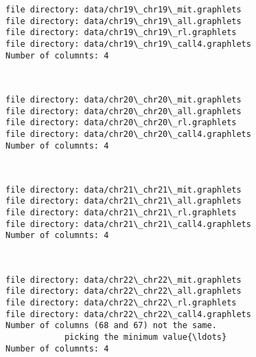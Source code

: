 \documentclass[11pt]{article}
\begin{document}
    \begin{Verbatim}[commandchars=\\\{\}]
file directory: data/chr19\_chr19\_mit.graphlets
file directory: data/chr19\_chr19\_all.graphlets
file directory: data/chr19\_chr19\_rl.graphlets
file directory: data/chr19\_chr19\_call4.graphlets
Number of columnts: 4

    \end{Verbatim}

    \begin{center}
    \end{center}
    { \hspace*{\fill} \\}
    
    \begin{Verbatim}[commandchars=\\\{\}]
file directory: data/chr20\_chr20\_mit.graphlets
file directory: data/chr20\_chr20\_all.graphlets
file directory: data/chr20\_chr20\_rl.graphlets
file directory: data/chr20\_chr20\_call4.graphlets
Number of columnts: 4

    \end{Verbatim}

    \begin{center}
    \end{center}
    { \hspace*{\fill} \\}
    
    \begin{Verbatim}[commandchars=\\\{\}]
file directory: data/chr21\_chr21\_mit.graphlets
file directory: data/chr21\_chr21\_all.graphlets
file directory: data/chr21\_chr21\_rl.graphlets
file directory: data/chr21\_chr21\_call4.graphlets
Number of columnts: 4

    \end{Verbatim}

    \begin{center}
    \end{center}
    { \hspace*{\fill} \\}
    
    \begin{Verbatim}[commandchars=\\\{\}]
file directory: data/chr22\_chr22\_mit.graphlets
file directory: data/chr22\_chr22\_all.graphlets
file directory: data/chr22\_chr22\_rl.graphlets
file directory: data/chr22\_chr22\_call4.graphlets
Number of columns (68 and 67) not the same.
            picking the minimum value{\ldots}
Number of columnts: 4

    \end{Verbatim}
\end{document}
